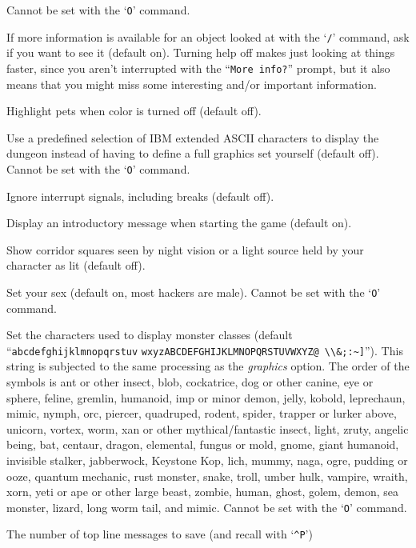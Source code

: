 Cannot be set with the `{\tt O}' command.
\item[\ib{help}]
If more information is available for an object looked at
with the `{\tt /}' command, ask if you want to see it (default on).
Turning help off makes just looking at things faster, since you aren't
interrupted with the ``{\tt More info?}'' prompt, but it also means that you
might miss some interesting and/or important information.
\item[\ib{hilite\_pet}]
Highlight pets when color is turned off (default off).
\item[\ib{IBMgraphics}]
Use a predefined selection of IBM extended ASCII characters to display the
dungeon instead of having to define a full graphics set yourself (default off).
Cannot be set with the `{\tt O}' command.
\item[\ib{ignintr}]
Ignore interrupt signals, including breaks (default off).
\item[\ib{legacy}]
Display an introductory message when starting the game (default on).
\item[\ib{lit\_corridor}]
Show corridor squares seen by night vision or a light source held by your
character as lit (default off).
\item[\ib{male}]
Set your sex (default on, most hackers are male).
Cannot be set with the `{\tt O}' command.
\item[\ib{monsters}]
Set the characters used to display monster classes (default
``\verb+abcdefghijklmnopqrstuv+
\verb+wxyzABCDEFGHIJKLMNOPQRSTUVWXYZ@ \\&;:~]+'').
This string is subjected to the same processing as the {\it graphics\/} option.
The order of the symbols is
ant or other insect, blob, cockatrice,
dog or other canine, eye or sphere, feline,
gremlin, humanoid, imp or minor demon,
jelly, kobold, leprechaun,
mimic, nymph, orc,
piercer, quadruped, rodent,
spider, trapper or lurker above, unicorn,
vortex, worm, xan or other mythical/fantastic insect,
light, zruty,
angelic being, bat, centaur,
dragon, elemental, fungus or mold,
gnome, giant humanoid, invisible stalker,
jabberwock, Keystone Kop, lich,
mummy, naga, ogre,
pudding or ooze, quantum mechanic, rust monster,
snake, troll, umber hulk,
vampire, wraith, xorn,
yeti or ape or other large beast, zombie,
human, ghost, golem,
demon, sea monster, lizard,
long worm tail, and mimic.
Cannot be set with the `{\tt O}' command.
\item[\ib{msghistory}]
The number of top line messages to save (and recall with `{\tt \^{}P}')
